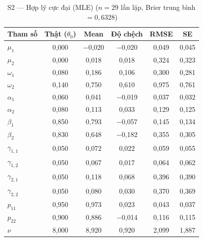 \documentclass[11pt,a4paper]{article}
\begin{document}
\begin{table}[H]\centering\scriptsize
\caption{S2 --- Hợp lý cực đại (MLE) ($n=29$ lần lặp, Brier trung bình $=0{,}6328$)}
\begin{tabularx}{\textwidth}{l C C C C C}
\toprule
\textbf{Tham số} & \textbf{Thật ($\theta_0$)} & \textbf{Mean} & \textbf{Độ chệch} & \textbf{RMSE} & \textbf{SE} \\
\midrule
$\mu_1$ & 0{,}000 & $-$0{,}020 & $-$0{,}020 & 0{,}049 & 0{,}045 \\
$\mu_2$ & 0{,}000 & 0{,}018 & 0{,}018 & 0{,}324 & 0{,}323 \\
$\omega_1$ & 0{,}080 & 0{,}186 & 0{,}106 & 0{,}300 & 0{,}281 \\
$\omega_2$ & 0{,}140 & 0{,}750 & 0{,}610 & 0{,}975 & 0{,}761 \\
$\alpha_1$ & 0{,}060 & 0{,}041 & $-$0{,}019 & 0{,}037 & 0{,}032 \\
$\alpha_2$ & 0{,}080 & 0{,}113 & 0{,}033 & 0{,}129 & 0{,}125 \\
$\beta_1$ & 0{,}850 & 0{,}793 & $-$0{,}057 & 0{,}145 & 0{,}134 \\
$\beta_2$ & 0{,}830 & 0{,}648 & $-$0{,}182 & 0{,}355 & 0{,}305 \\
$\gamma_{1,1}$ & 0{,}050 & 0{,}072 & 0{,}022 & 0{,}059 & 0{,}055 \\
$\gamma_{1,2}$ & 0{,}050 & 0{,}067 & 0{,}017 & 0{,}064 & 0{,}062 \\
$\gamma_{2,1}$ & 0{,}050 & 0{,}118 & 0{,}068 & 0{,}396 & 0{,}390 \\
$\gamma_{2,2}$ & 0{,}050 & 0{,}080 & 0{,}030 & 0{,}370 & 0{,}369 \\
$p_{11}$ & 0{,}950 & 0{,}973 & 0{,}023 & 0{,}043 & 0{,}037 \\
$p_{22}$ & 0{,}900 & 0{,}886 & $-$0{,}014 & 0{,}116 & 0{,}115 \\
$\nu$ & 8{,}000 & 8{,}920 & 0{,}920 & 2{,}099 & 1{,}887 \\
\bottomrule
\end{tabularx}
\end{table}
\end{document}
